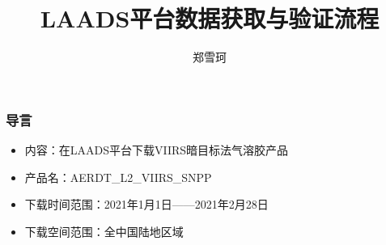 \documentclass{ctexbeamer}
\title{LAADS平台数据获取与验证流程}
\author{郑雪珂}
\institute{河南理工大学}
\begin{document}
\frame{\titlepage}
\begin{frame}
  \frametitle{导言}
  \begin{itemize}
    \item 内容：在LAADS平台下载VIIRS暗目标法气溶胶产品
    \item 产品名：AERDT\_L2\_VIIRS\_SNPP
    \item 下载时间范围：2021年1月1日——2021年2月28日
    \item 下载空间范围：全中国陆地区域
  \end{itemize}
\end{frame}



\end{document}
